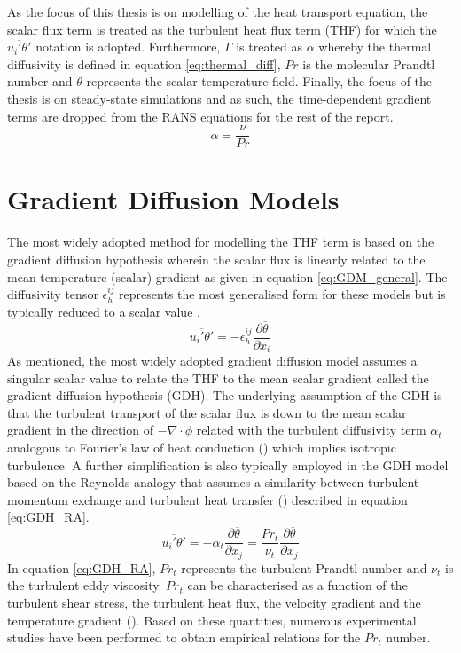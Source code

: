 As the focus of this thesis is on modelling of the heat transport equation, the scalar flux term is treated as the turbulent heat flux term (THF) for which the $\overline{u_{i}'\theta'}$ notation is adopted. Furthermore, $\Gamma$ is treated as $\alpha$ whereby the thermal diffusivity is defined in equation \ref{eq:thermal_diff}, $Pr$ is the molecular Prandtl number and $\theta$ represents the scalar temperature field. Finally, the focus of the thesis is on steady-state simulations and as such, the time-dependent gradient terms are dropped from the RANS equations for the rest of the report. 
\begin{equation}
\label{eq:thermal_diff}
\alpha = \frac{\nu}{Pr}
\end{equation}
\section{Gradient Diffusion Models}
The most widely adopted method for modelling the THF term is based on the gradient diffusion hypothesis wherein the scalar flux is linearly related to the mean temperature (scalar) gradient as given in equation \ref{eq:GDM_general}. The diffusivity tensor $\epsilon^{ij}_{h}$ represents the most generalised form for these models but is typically reduced to a scalar value \cite{Grotzbach2013}.
\begin{equation}
\label{eq:GDM_general}
\overline{u_{i}'\theta'} = -\epsilon^{ij}_{h}\frac{\partial\overline{\theta}}{\partial x_{i}}
\end{equation}
As mentioned, the most widely adopted gradient diffusion model assumes a singular scalar value to relate the THF to the mean scalar gradient called the gradient diffusion hypothesis (GDH). The underlying assumption of the GDH is that the turbulent transport of the scalar flux is down to the mean scalar gradient in the direction of $-\nabla \cdot \phi$ related with the turbulent diffusivity term $\alpha_{t}$ analogous to Fourier's law of heat conduction (\cite{Pope2000}) which implies isotropic turbulence. A further simplification is also typically employed in the GDH model based on the Reynolds analogy that assumes a similarity between turbulent momentum exchange and turbulent heat transfer (\cite{Bartosiewicz2019}) described in equation \ref{eq:GDH_RA}. 
\begin{equation}
\label{eq:GDH_RA}
\overline{u_{i}' \theta'} = -\alpha_{t} \frac{\partial \overline{\theta}}{\partial x_{j}} = \frac{Pr_{t}}{\nu_{t}}  \frac{\partial \overline{\theta}}{\partial x_{j}} 
\end{equation}
In equation \ref{eq:GDH_RA}, $Pr_{t}$ represents the turbulent Prandtl number and $\nu_{t}$ is the turbulent eddy viscosity. $Pr_{t}$ can be characterised as a function of the turbulent shear stress, the turbulent heat flux, the velocity gradient and the temperature gradient (\cite{Kays1994}). Based on these quantities, numerous experimental studies have been performed to obtain empirical relations for the $Pr_{t}$ number.

